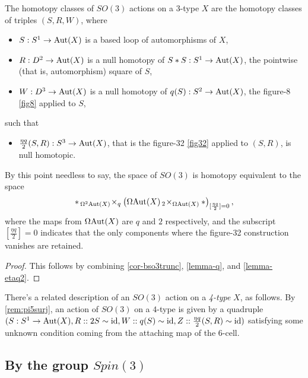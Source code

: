 \documentclass{amsart}
\begin{document}
\begin{theorem}[Actions of $SO(3)$] 
\label{thm-so3action}
The homotopy classes of $SO(3)$ actions on a 3-type $X$ are the homotopy classes of triples $(S,R,W)$, where 
\begin{itemize}
\item $S: S^1 \rightarrow \mathrm{Aut}(X)$ is a based loop of automorphisms of $X$,
\item $R: D^2 \rightarrow \mathrm{Aut}(X)$ is a null homotopy of $S \ast S: S^1 \rightarrow \mathrm{Aut}(X)$, the pointwise (that is, automorphism) square of $S$,
\item $W: D^3 \rightarrow \mathrm{Aut}(X)$ is a null homotopy of $q(S): S^2 \rightarrow \mathrm{Aut}(X)$, the figure-8 \cref{fig8} applied to $S$,
\end{itemize}
such that
\begin{itemize}
\item $\frac{\eta q}{2} (S,R) : S^3 \rightarrow \mathrm{Aut}(X)$, that is the figure-32 \cref{fig32} applied to $(S,R)$, is null homotopic.
\end{itemize}
\end{theorem}
\nid By this point needless to say, the space of $SO(3)$ is homotopy equivalent to the space
\[
\ast \,_{\Omega^2 \mathrm{Aut}(X)}\! \times_q \left(\Omega \mathrm{Aut}(X) \,_2\! \times_{\Omega \mathrm{Aut}(X)} \ast\right)_{[\frac{\eta q}{2}]=0},
\]
where the maps from $\Omega \mathrm{Aut}(X)$ are $q$ and $2$ respectively, and the subscript $[\frac{\eta q}{2}]=0$ indicates that the only components where the figure-32 construction vanishes are retained.
\begin{proof}
This follows by combining \cref{cor-bso3trunc}, \cref{lemma-q}, and \cref{lemma-etaq2}.
\end{proof}

\begin{remark}
There's a related description of an $SO(3)$ action on a \emph{4-type} $X$, as follows. By \cref{rem:pi5surj},  an action of $SO(3)$ on a $4$-type is given by a quadruple $(S: S^1 \rightarrow \mathrm{Aut}(X),R:: 2 S \sim \mathrm{id},W:: q(S) \sim \mathrm{id}, Z:: \frac{\eta q}{2} (S,R) \sim \mathrm{id})$ satisfying some unknown condition coming from the attaching map of the $6$-cell.
\end{remark}


\subsection{By the group $Spin(3)$}
\end{document}
